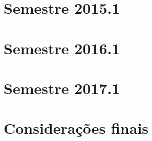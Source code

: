 \acresetall
\section{Semestre 2015.1}
\section{Semestre 2016.1}
\section{Semestre 2017.1}
\section{Considerações finais}

